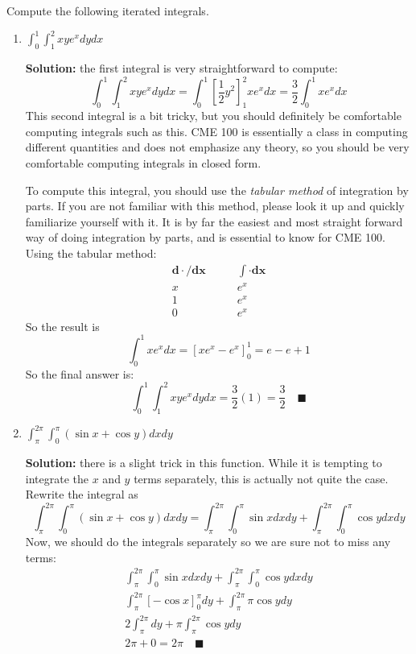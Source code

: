 \documentclass[letterpaper, 11pt]{article}
\begin{document}
\subsection{} Compute the following iterated integrals. 
\begin{enumerate}[label=(\alph*)]
\item $\int_0^1 \int_1^2 x y e^x dy dx $
\par \textbf{Solution:} the first integral is very straightforward to compute:
\[ \int_0^1 \int_1^2 x y e^x dy dx = \int_0^1\left[ \frac{1}{2}y^2\right]_1^2 x e^x dx = \frac{3}{2} \int_0^1 xe^x dx \]
This second integral is a bit tricky, but you should definitely be comfortable computing integrals such as this. CME 100 is essentially a class in computing different quantities and does not emphasize any theory, so you should be very comfortable computing integrals in closed form. 
\par To compute this integral, you should use the \textit{tabular method} of integration by parts. If you are not familiar with this method, please look it up and quickly familiarize yourself with it. It is by far the easiest and most straight forward way of doing integration by parts, and is essential to know for CME 100. Using the tabular method:
\begin{align*}
\mathbf{d\cdot/dx} &\qquad \mathbf{\int \cdot dx} \\
x & \qquad e^x \\
1 & \qquad e^x \\
0 & \qquad e^x 
\end{align*}
So the result is
\[  \int_0^1 xe^x dx = \left[ xe^x - e^x \right]_0^1 = e - e + 1\]
So the final answer is:
\[  \int_0^1 \int_1^2 x y e^x dy dx = \frac{3}{2}(1) = \frac{3}{2} \quad\blacksquare \]

\item $\int_\pi^{2 \pi} \int_0^\pi (\sin x + \cos y) dx dy$
\par \textbf{Solution:} there is a slight trick in this function. While it is tempting to integrate the $x$ and $y$ terms separately, this is actually not quite the case. Rewrite the integral as
\[ \int_\pi^{2 \pi} \int_0^\pi (\sin x + \cos y) dx dy = \int_\pi^{2 \pi} \int_0^\pi \sin x dx dy + \int_\pi^{2 \pi} \int_0^\pi  \cos y dx dy \]
Now, we should do the integrals separately so we are sure not to miss any terms:
\begin{gather*}
\int_\pi^{2 \pi} \int_0^\pi \sin x dx dy + \int_\pi^{2 \pi} \int_0^\pi  \cos y dx dy  \\
\int_\pi^{2 \pi} \left[ - \cos x \right]_0^\pi dy + \int_\pi^{2 \pi} \pi  \cos y dy  \\
2 \int_\pi^{2 \pi} dy + \pi \int_\pi^{2 \pi} \cos y dy  \\
2 \pi + 0 = 2 \pi \quad \blacksquare 
\end{gather*}


\end{enumerate}
\end{document}
